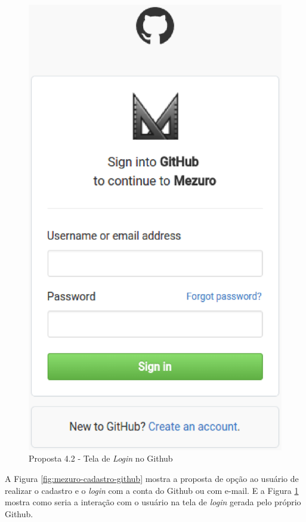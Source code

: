 \begin{figure}[!htb]
	\centering
    \includegraphics[keepaspectratio=true,scale=0.5]
    {figuras/singup_mezuro_github.eps}
  \caption{Proposta 4.2 - Tela de \textit{Login} no Github}
  \label{fig:singup_mezuro_github}
\end{figure}

A Figura \ref{fig:mezuro-cadastro-github} mostra a proposta de opção ao usuário
de realizar o cadastro e o \textit{login} com a conta do Github ou com e-mail.
E a Figura \ref{fig:singup_mezuro_github} mostra como seria a interação com o
usuário na tela de \textit{login} gerada pelo próprio Github.

